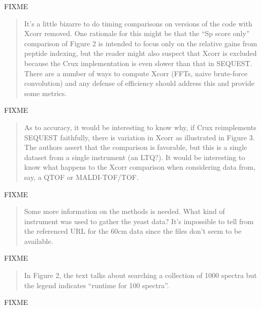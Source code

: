 \documentclass{article}
\newcommand{\breview}{\begin{quotation}\begin{em}\noindent}
\newcommand{\ereview}{\end{em}\end{quotation}}
\begin{document}
FIXME

\breview It's a little bizarre to do timing comparisons on versions of
the code with Xcorr removed. One rationale for this might be that the
``Sp score only'' comparison of Figure 2 is intended to focus only on
the relative gains from peptide indexing, but the reader might also
suspect that Xcorr is excluded because the Crux implementation is even
slower than that in SEQUEST. There are a number of ways to compute
Xcorr (FFTs, naive brute-force convolution) and any defense of
efficiency should address this and provide some metrics. \ereview

FIXME

\breview As to accuracy, it would be interesting to know why, if Crux
reimplements SEQUEST faithfully, there is variation in Xcorr as
illustrated in Figure 3. The authors assert that the comparison is
favorable, but this is a single dataset from a single instrument (an
LTQ?). It would be interesting to know what happens to the Xcorr
comparison when considering data from, say, a QTOF or
MALDI-TOF/TOF. \ereview

FIXME

\breview Some more information on the methods is needed. What kind of
instrument was used to gather the yeast data? It's impossible to tell
from the referenced URL for the 60cm data since the files don't seem
to be available. \ereview

FIXME

\breview In Figure 2, the text talks about searching a collection of
1000 spectra but the legend indicates ``runtime for 100
spectra''. \ereview

FIXME
\end{document}
